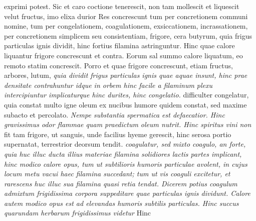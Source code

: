 exprimi potest. Sic et caro\protect{} coctione tenerescit,  non tam mollescit et liquescit velut fructus, imo elixa durior 
\pend
\pstart {} Res concrescunt tum per concretionem communi nomine, tum per congelationem\protect{}, coagulationem\protect{}, exsiccationem\protect{}, incrassationem\protect{}, per concretionem simplicem seu consistentiam, frigore, cera butyrum, quia frigus particulas ignis dividit, hinc fortius filamina astringuntur. Hinc quae calore liquantur frigore concrescunt et contra. Eorum sal summo calore liquatum, eo remoto statim concrescit. Porro et quae  frigore concrescunt, etiam fructus\protect{}, arbores\protect{}, lutum\protect{}, \textit{quia dividit frigus particulas ignis quae aquae insunt, hinc prae densitate contrahuntur idque in orbem hinc facile a filaminum plexu intercipiuntur implicaturque hinc durites, hinc congelatio. } difficulter congelatur, quia constat multo igne oleum ex nucibus humore quidem constat, sed maxime subacto et percolato. \textit{Nempe substantia spermatica est defaecatior. Hinc gravissimus odor flammae quam praedictum oleum nutrit. Hinc spiritus vini non } 
\pend
\count{}
\count{}
\pstart {} fit tam frigore, ut sanguis, unde facilius hyeme\protect{} gerescit, hinc serosa portio supernatat, terrestrior deorsum tendit. 
\textit{coagulatur, sed mixto coagulo, an forte, quia huc illuc ducta illius materiae filamina solidiores lactis partes implicant, hinc modico calore opus, tum ut subtilioris humoris particulae avolent, in cujus locum metu vacui\protect{} haec filamina succedant; tum ut vis coaguli excitetur, et rarescens huc illuc sua filamina quasi retia tendat. Dicerem potius coagulum admixtum frigidissima corpora suppeditare quae particulas ignis dividunt.
Calore autem modico opus est ad elevandas humoris subtilis particulas.
Hinc succus quarundam herbarum frigidissimus videtur 
} Hinc
